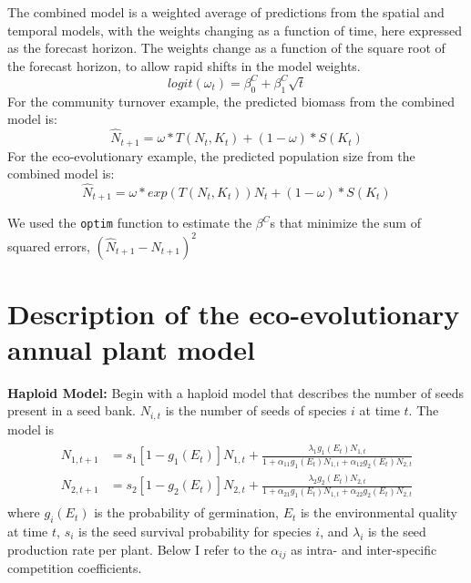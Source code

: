 \documentclass[11pt]{article}
\begin{document}
The combined model is a weighted average of predictions from the spatial and temporal models, with the weights changing as a function of time, here expressed as the forecast horizon. The weights change as a function of the square root of the forecast horizon, to allow rapid shifts in the model weights. 
\begin{equation}
logit(\omega_t)=\beta^C_0 + \beta^C_1 \sqrt{t}
\label{eqn:weights}
\end{equation}
For the community turnover example, the predicted biomass from the combined model is:
\begin{equation}
\hat{N}_{t+1} = \omega *T(N_{t},K_t) + (1-\omega) * S(K_t) 
\label{eqn:combined_model}
\end{equation}
For the eco-evolutionary example, the predicted population size from the combined model is:
\begin{equation}
\hat{N}_{t+1} = \omega * exp(T(N_{t},K_t)) N_t + (1-\omega) * S(K_t) 
\label{eqn:combined_model}
\end{equation}

We used the \texttt{optim} function to estimate the $\beta^C$s that minimize the sum of squared errors, $(\hat{N}_{t+1} - N_{t+1})^2$

\section{Description of the eco-evolutionary annual plant model}\label{eco-evo}

\renewcommand{\theequation}{B-\arabic{equation}}
\renewcommand{\thetable}{B-\arabic{table}}
\renewcommand{\thefigure}{B-\arabic{figure}}

\noindent \textbf{Haploid Model:} Begin with a haploid model that describes the number of seeds present in a seed bank.  $N_{i,t}$ is the number of seeds of species $i$ at time $t$.  The model is
\begin{align}\begin{split}
N_{1,t+1} &= s_1 [1-g_1(E_t)]N_{1,t}+\frac{\lambda_1g_1(E_t)N_{1,t}}{1+ \alpha_{11}g_1(E_t)N_{1,t} + \alpha_{12}g_2(E_t)N_{2,t}}\\
N_{2,t+1} &= s_2 [1-g_2(E_t)]N_{2,t}+\frac{\lambda_2g_2(E_t)N_{2,t}}{1+ \alpha_{21}g_1(E_t)N_{1,t} + \alpha_{22}g_2(E_t)N_{2,t}}
\end{split}\end{align}
where $g_{i}(E_t)$ is the probability of germination, $E_t$ is the environmental quality at time $t$, $s_i$ is the seed survival probability for species $i$, and $\lambda_i$ is the seed production rate per plant.  Below I refer to the $\alpha_{ij}$ as intra- and inter-specific competition coefficients.  \\
\end{document}
